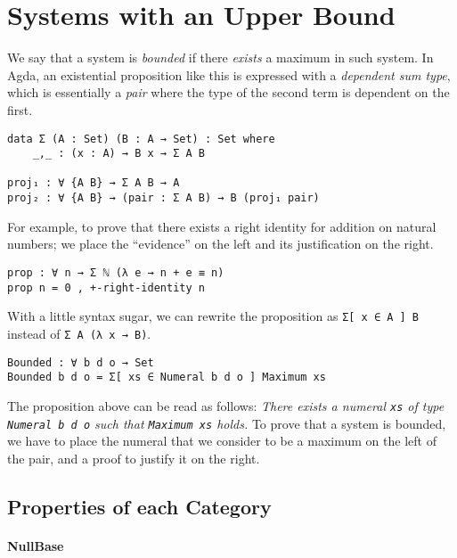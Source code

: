 \documentclass[\main/thesis.tex]{subfiles}
\begin{document}
\section{Systems with an Upper Bound}\label{bounded}

We say that a system is \textit{bounded} if there \textit{exists} a maximum in
such system. In Agda, an existential proposition like this is expressed with
a \textit{dependent sum type}, which is essentially a \textit{pair} where the
type of the second term is dependent on the first.

\begin{lstlisting}
data Σ (A : Set) (B : A → Set) : Set where
    _,_ : (x : A) → B x → Σ A B

proj₁ : ∀ {A B} → Σ A B → A
proj₂ : ∀ {A B} → (pair : Σ A B) → B (proj₁ pair)
\end{lstlisting}

For example, to prove that there exists a right identity for addition on natural numbers;
we place the ``evidence'' on the left and its justification on the right.

\begin{lstlisting}
prop : ∀ n → Σ ℕ (λ e → n + e ≡ n)
prop n = 0 , +-right-identity n
\end{lstlisting}

With a little syntax sugar, we can rewrite the proposition as
{\lstinline|Σ[ x ∈ A ] B|} instead of {\lstinline|Σ A (λ x → B)|}.

\begin{lstlisting}
Bounded : ∀ b d o → Set
Bounded b d o = Σ[ xs ∈ Numeral b d o ] Maximum xs
\end{lstlisting}

The proposition above can be read as follows:
\textit{There exists a numeral {\lstinline|xs|} of type
{\lstinline|Numeral b d o|} such that {\lstinline|Maximum xs|} holds.}
To prove that a system is bounded, we have to place the numeral that we consider
to be a maximum on the left of the pair, and a proof to justify it on the right.

\subsection{Properties of each Category}

\paragraph{NullBase}
\end{document}
